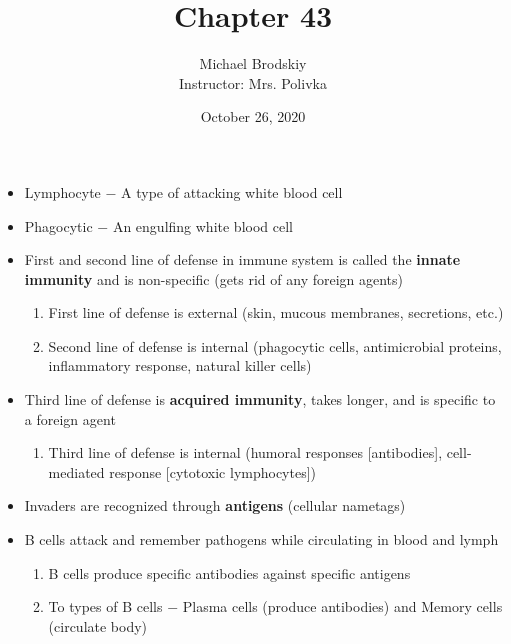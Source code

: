 \documentclass[12pt]{article}
\title{Chapter 43}
\date{October 26, 2020}
\author{Michael Brodskiy\\ \small Instructor: Mrs. Polivka}
\begin{document}
\maketitle

\begin{itemize}

  \item Lymphocyte $-$ A type of attacking white blood cell

  \item Phagocytic $-$ An engulfing white blood cell

  \item First and second line of defense in immune system is called the \textbf{innate immunity} and is non-specific (gets rid of any foreign agents)

    \begin{enumerate}

      \item First line of defense is external (skin, mucous membranes, secretions, etc.)

      \item Second line of defense is internal (phagocytic cells, antimicrobial proteins, inflammatory response, natural killer cells)

    \end{enumerate}

  \item Third line of defense is \textbf{acquired immunity}, takes longer, and is specific to a foreign agent

    \begin{enumerate}

      \item Third line of defense is internal (humoral responses [antibodies], cell-mediated response [cytotoxic lymphocytes])

    \end{enumerate}

  \item Invaders are recognized through \textbf{antigens} (cellular nametags)

  \item B cells attack and remember pathogens while circulating in blood and lymph

   \begin{enumerate}

     \item B cells produce specific antibodies against specific antigens

     \item To types of B cells $-$ Plasma cells (produce antibodies) and Memory cells (circulate body)


\end{enumerate}
\end{itemize}
\end{document}
